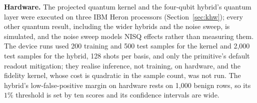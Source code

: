 \textbf{Hardware.} The projected quantum kernel and the four-qubit hybrid's quantum layer were executed
on three IBM Heron processors (Section~\ref{sec:khw}); every other quantum result, including the wider
hybrids and the noise sweep, is simulated, and the noise sweep models NISQ effects rather than measuring
them. The device runs used 200 training and 500 test samples for the kernel and 2{,}000 test samples for
the hybrid, 128 shots per basis, and only the primitive's default readout mitigation; they realise
inference, not training, on hardware, and the fidelity kernel, whose cost is quadratic in the sample
count, was not run. The hybrid's low-false-positive margin on hardware rests on 1{,}000 benign rows, so
its $1\%$ threshold is set by ten scores and its confidence intervals are wide.
